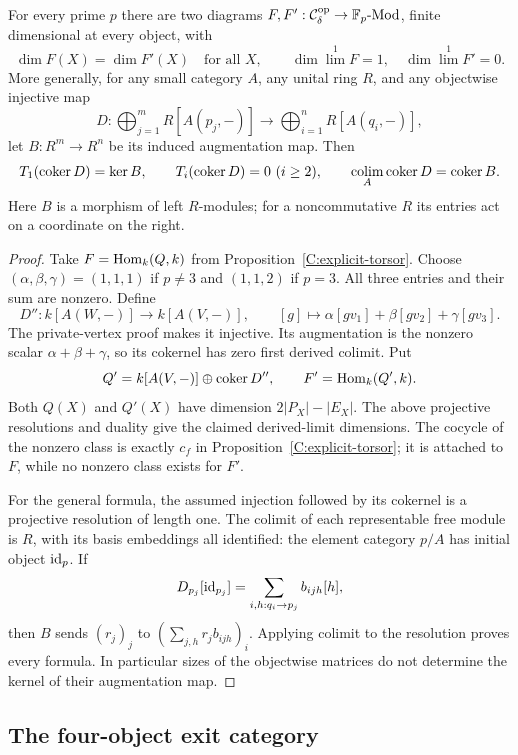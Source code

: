 \begin{theorem}\label{C:dimensions}
For every prime $p$ there are two diagrams $F,F':\mathcal C_\delta^{\mathrm{op}}\to\mathbb F_p\text{-}\mathrm{Mod}$, finite dimensional at every object, with
\[
 \dim F(X)=\dim F'(X)\quad\text{for all }X,
 \qquad \dim\lim^1F=1,\quad \dim\lim^1F'=0.
\]
More generally, for any small category $A$, any unital ring $R$, and any objectwise injective map
\[
 D:\bigoplus_{j=1}^{m}R[A(p_j,-)]\longrightarrow
       \bigoplus_{i=1}^{n}R[A(q_i,-)],
\]
let $B:R^m\to R^n$ be its induced augmentation map. Then
\[
 T_1(\operatorname{coker} D)=\ker B,\qquad
 T_i(\operatorname{coker} D)=0\ (i\geq2),\qquad
 \operatorname*{colim}_A\operatorname{coker} D=\operatorname{coker} B.
\]
Here $B$ is a morphism of left $R$-modules; for a noncommutative $R$ its entries act on a coordinate on the right.
\end{theorem}
\begin{proof}
Take $F=\operatorname{Hom}_k(Q,k)$ from Proposition~\ref{C:explicit-torsor}. Choose $(\alpha,\beta,\gamma)=(1,1,1)$ if $p\ne3$ and $(1,1,2)$ if $p=3$. All three entries and their sum are nonzero. Define
\[
 D'':k[A(W,-)]\to k[A(V,-)],\qquad
 [g]\mapsto\alpha[gv_1]+\beta[gv_2]+\gamma[gv_3].
\]
The private-vertex proof makes it injective. Its augmentation is the nonzero scalar $\alpha+\beta+\gamma$, so its cokernel has zero first derived colimit. Put
\[
 Q'=k[A(V,-)]\oplus\operatorname{coker} D'',\qquad F'=\operatorname{Hom}_k(Q',k).
\]
Both $Q(X)$ and $Q'(X)$ have dimension $2|P_X|-|E_X|$. The above projective resolutions and duality give the claimed derived-limit dimensions. The cocycle of the nonzero class is exactly $c_f$ in Proposition~\ref{C:explicit-torsor}; it is attached to $F$, while no nonzero class exists for $F'$.

For the general formula, the assumed injection followed by its cokernel is a projective resolution of length one. The colimit of each representable free module is $R$, with its basis embeddings all identified: the element category $p/A$ has initial object $\mathrm{id}_p$. If
\[
 D_{p_j}[\mathrm{id}_{p_j}]=\sum_{i,h:q_i\to p_j}b_{ijh}[h],
\]
then $B$ sends $(r_j)_j$ to $(\sum_{j,h}r_jb_{ijh})_i$. Applying colimit to the resolution proves every formula. In particular sizes of the objectwise matrices do not determine the kernel of their augmentation map.
\end{proof}

\subsection{The four-object exit category}

